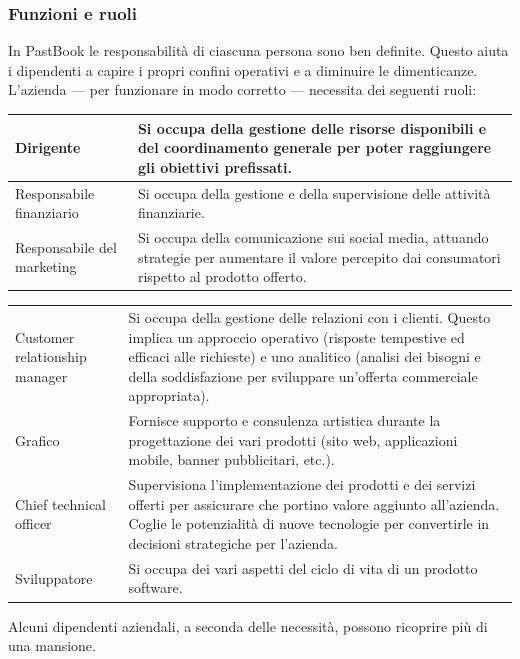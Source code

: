			\subsubsection{Funzioni e ruoli}
				In PastBook le responsabilità di ciascuna persona sono ben definite. Questo aiuta i dipendenti a capire i propri
				confini operativi e a diminuire le dimenticanze.\\
				L'azienda — per funzionare in modo corretto — necessita dei seguenti ruoli:
				\begin{center}
					\begin{tabular}[H]{p{} p{}}
						Dirigente 			& Si occupa della gestione delle risorse disponibili e del
										  coordinamento generale per poter raggiungere gli obiettivi
										  prefissati.\\
						\hline
						Responsabile finanziario	& Si occupa della gestione e della supervisione delle attività
										  finanziarie.\\
						\hline
						Responsabile del marketing	& Si occupa della comunicazione sui social media, attuando strategie
										  per aumentare il valore percepito dai consumatori rispetto al
										  prodotto offerto.\\
					\end{tabular}
				\end{center}
				\begin{center}
					\begin{tabular}[H]{p{} p{}}
						Customer relationship manager	& Si occupa della gestione delle relazioni con i clienti. Questo
										  implica un approccio operativo (risposte tempestive ed efficaci
										  alle richieste) e uno analitico (analisi dei bisogni e della
										  soddisfazione per sviluppare un'offerta commerciale appropriata).\\
						Grafico				& Fornisce supporto e consulenza artistica durante la progettazione
										  dei vari prodotti (sito web, applicazioni mobile, banner
										  pubblicitari, etc.).\\
						\hline
						Chief technical officer		& Supervisiona l'implementazione dei prodotti e dei servizi offerti
										  per assicurare che portino valore aggiunto all'azienda. Coglie le
										  potenzialità di nuove tecnologie per convertirle in decisioni
										  strategiche per l'azienda.\\
						\hline
						Sviluppatore 			& Si occupa dei vari aspetti del ciclo di vita di un prodotto
										  software.\\
					\end{tabular}
				\end{center}
				Alcuni dipendenti aziendali, a seconda delle necessità, possono ricoprire più di una mansione.
